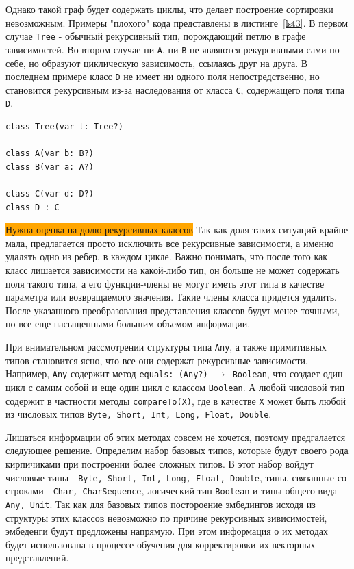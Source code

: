 \documentclass[times,specification,annotation]{itmo-student-thesis}
\begin{document}
Однако такой граф будет содержать циклы, что делает построение сортировки невозможным. Примеры "плохого" кода представлены в листинге~\ref{lst3}. В первом случае \texttt{Tree} - обычный рекурсивный тип, порождающий петлю в графе зависимостей. Во втором случае ни \texttt{A}, ни \texttt{B} не являются рекурсивными сами по себе, но образуют циклическую зависимость, ссылаясь друг на друга. В последнем примере класс \texttt{D} не имеет ни одного поля непостредственно, но становится рекурсивным из-за наследования от класса \texttt{C}, содержащего поля типа \texttt{D}.

\begin{lstlisting}[float=!h,caption={Типы с циклическими зависимостями},label={lst3}]
class Tree(var t: Tree?)

class A(var b: B?)
class B(var a: A?)

class C(var d: D?)
class D : C
\end{lstlisting}

\colorbox{orange}{Нужна оценка на долю рекурсивных классов}
Так как доля таких ситуаций крайне мала, предлагается просто исключить все рекурсивные зависимости, а именно удалять одно из ребер, в каждом цикле. Важно понимать, что после того как класс лишается зависимости на какой-либо тип, он больше не может содержать поля такого типа, а его функции-члены не могут иметь этот типа в качестве параметра или возвращаемого значения. Такие члены класса придется удалить. После указанного преобразования представления классов будут менее точными, но все еще насыщенными большим объемом информации.

При внимательном рассмотрении структуры типа \texttt{Any}, а также примитивных типов становится ясно, что все они содержат рекурсивные зависимости. Например, \texttt{Any} содержит метод \texttt{equals: (Any?)  $\rightarrow$ Boolean}, что создает один цикл с самим собой и еще один цикл с классом \texttt{Boolean}. А любой числовой тип содержит в частности методы \texttt{compareTo(X)}, где в качестве \texttt{X} может быть любой из числовых типов \texttt{Byte, Short, Int, Long, Float, Double}. 

Лишаться информации об этих методах совсем не хочется, поэтому предгалается следующее решение. Определим набор базовых типов, которые будут своего рода кирпичиками при построении более сложных типов. В этот набор войдут числовые типы - \texttt{Byte, Short, Int, Long, Float, Double}, типы, связанные со строками - \texttt{Char, CharSequence}, логический тип \texttt{Boolean} и типы общего вида \texttt{Any, Unit}. Так как для базовых типов постороение эмбедингов исходя из структуры этих классов невозможно по причине рекурсивных зивисимостей, эмбеденги будут предложены напрямую. При этом информация о их методах будет использована в процессе обучения для корректировки их векторных представлений.
\end{document}
